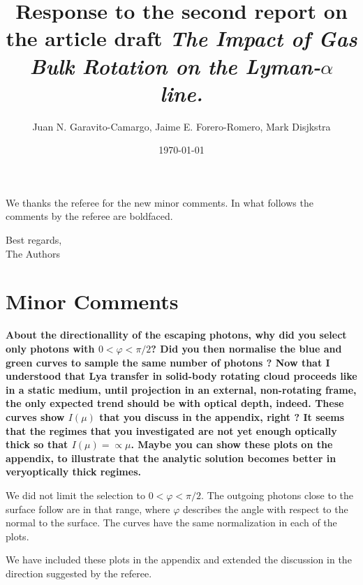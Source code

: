\documentclass[12pt]{article}
\title{Response to the second report on the article draft \emph{The
    Impact of Gas Bulk Rotation on the Lyman-$\alpha$ line.}}
\author{Juan N. Garavito-Camargo, Jaime E. Forero-Romero, Mark Disjkstra}
\date{\today}
\begin{document}
\maketitle

We thanks the referee for the new minor comments. 
In what follows the comments by the referee are boldfaced.

Best regards, \\

The Authors\\

\section*{Minor Comments}

{\bf About the directionallity of the escaping photons, why did you select only photons with $0 < \varphi < \pi/2$? Did you then normalise the blue and green curves to sample the same number of photons ? Now that I understood that Lya transfer in solid-body rotating cloud proceeds like in a static medium, until projection in an external, non-rotating frame, the only expected trend should be with optical depth, indeed. These curves show $I(\mu)$ that you discuss in the appendix, right ? It seems that the regimes that you investigated are not yet enough optically thick so that $I(\mu) = \propto \mu$. Maybe you can show these plots on the appendix, to illustrate that the analytic solution becomes better in veryoptically thick regimes.}

We did not limit the selection to $0 < \varphi < \pi/2$. The outgoing
photons close to the surface follow are in that range, where $\varphi$
describes the angle with respect to the normal to the surface.  The
curves have the same normalization in each of the plots.  

We have included these plots in the appendix and extended the
discussion in the direction suggested by the referee. 
\end{document}
